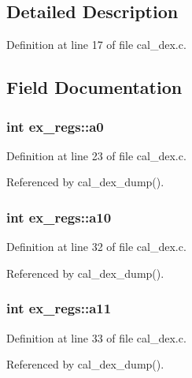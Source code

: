 \subsection{Detailed Description}


Definition at line 17 of file cal\-\_\-dex.\-c.



\subsection{Field Documentation}
\hypertarget{structex__regs_ab9e470c41e6c89050e83f07ba3d020a6}{
\subsubsection[{a0}]{\setlength{\rightskip}{0pt plus 5cm}int ex\-\_\-regs\-::a0}}\label{structex__regs_ab9e470c41e6c89050e83f07ba3d020a6}


Definition at line 23 of file cal\-\_\-dex.\-c.



Referenced by cal\-\_\-dex\-\_\-dump().

\hypertarget{structex__regs_af85ef649abe139889371e7bbecad73ad}{
\subsubsection[{a10}]{\setlength{\rightskip}{0pt plus 5cm}int ex\-\_\-regs\-::a10}}\label{structex__regs_af85ef649abe139889371e7bbecad73ad}


Definition at line 32 of file cal\-\_\-dex.\-c.



Referenced by cal\-\_\-dex\-\_\-dump().

\hypertarget{structex__regs_a94aedd1e40a7f814340b845ba35c6b62}{
\subsubsection[{a11}]{\setlength{\rightskip}{0pt plus 5cm}int ex\-\_\-regs\-::a11}}\label{structex__regs_a94aedd1e40a7f814340b845ba35c6b62}


Definition at line 33 of file cal\-\_\-dex.\-c.



Referenced by cal\-\_\-dex\-\_\-dump().

